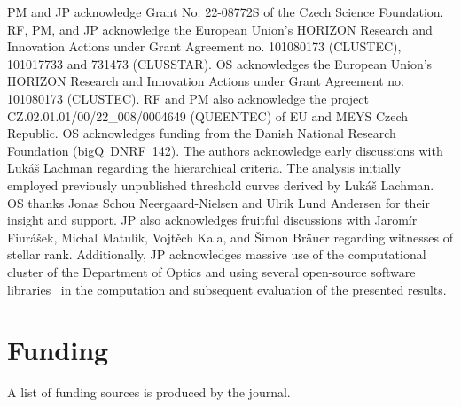 \documentclass{article}
\begin{document}
PM and JP acknowledge Grant No. 22-08772S of the Czech Science Foundation.
RF, PM, and JP acknowledge the European Union's HORIZON Research and Innovation Actions under Grant Agreement no. 101080173 (CLUSTEC), 101017733 and 731473 (CLUSSTAR). OS acknowledges the European Union's HORIZON Research and Innovation Actions under Grant Agreement no. 101080173 (CLUSTEC). RF and PM also acknowledge the project CZ.02.01.01/00/22\_008/0004649 (QUEENTEC) of EU and MEYS Czech Republic. OS acknowledges funding from the Danish National Research Foundation (bigQ~DNRF~142).
%
The authors acknowledge early discussions with Luk\'{a}\v{s} Lachman regarding the hierarchical criteria. The analysis initially employed previously unpublished threshold curves derived by Luk\'{a}\v{s} Lachman. 
%
OS thanks Jonas Schou Neergaard-Nielsen and Ulrik Lund Andersen for their insight and support. 
%
JP also acknowledges fruitful discussions with Jarom\'{i}r Fiur\'{a}\v{s}ek, Michal Matul\'{i}k, Vojt\v{e}ch Kala, and \v{S}imon Br\"{a}uer regarding witnesses of stellar rank. Additionally, JP acknowledges massive use of the computational cluster of the Department of Optics and using several open-source software libraries~\cite{hunter2007,harris2020,virtanen2020,dalcin2021} in the computation and subsequent evaluation of the presented results.

\FloatBarrier
\section*{Funding}

A list of funding sources is produced by the journal.

%

\FloatBarrier
\printbibliography
\end{document}
